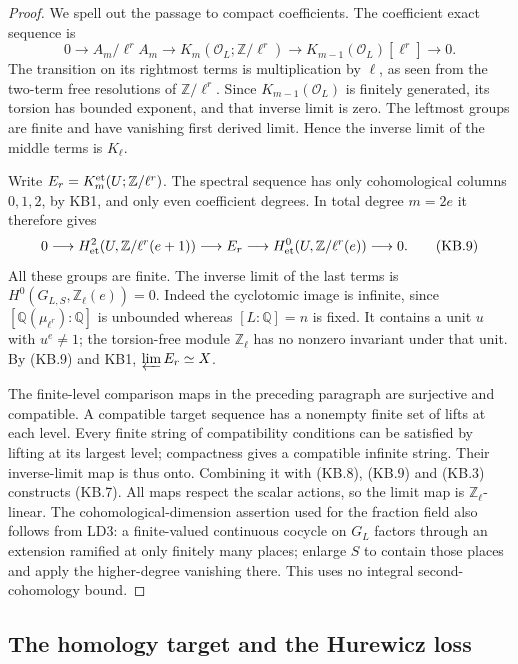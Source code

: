 \begin{proof}
We spell out the passage to compact coefficients.  The coefficient
exact sequence is
\[
 0\longrightarrow A_m/\ell^r A_m
 \longrightarrow K_m(\mathcal O_L;\mathbb Z/\ell^r)
 \longrightarrow K_{m-1}(\mathcal O_L)[\ell^r]
 \longrightarrow0.
 \tag{KB.8}
\]
The transition on its rightmost terms is multiplication by $\ell$,
as seen from the two-term free resolutions of $\mathbb Z/\ell^r$.
Since $K_{m-1}(\mathcal O_L)$ is finitely generated, its torsion has
bounded exponent, and that inverse limit is zero.  The leftmost
groups are finite and have vanishing first derived limit.  Hence
the inverse limit of the middle terms is $K_\ell$.

Write $E_r=K_m^{\rm et}(U;\mathbb Z/\ell^r)$.  The spectral sequence
has only cohomological columns $0,1,2$, by KB1, and only even
coefficient degrees.  In total degree $m=2e$ it therefore gives
\[
 0\longrightarrow H^2_{\rm et}(U,\mathbb Z/\ell^r(e+1))
 \longrightarrow E_r
 \longrightarrow H^0_{\rm et}(U,\mathbb Z/\ell^r(e))
 \longrightarrow0.
 \tag{KB.9}
\]
All these groups are finite.  The inverse limit of the last terms
is $H^0(G_{L,S},\mathbb Z_\ell(e))=0$.  Indeed the cyclotomic
image is infinite, since $[\mathbb Q(\mu_{\ell^r}):\mathbb Q]$
is unbounded whereas $[L:\mathbb Q]=n$ is fixed.  It contains a
unit $u$ with $u^e\ne1$; the torsion-free module
$\mathbb Z_\ell$ has no nonzero invariant under that unit.
By (KB.9) and KB1, $\varprojlim E_r\simeq X$.

The finite-level comparison maps in the preceding paragraph are
surjective and compatible.  A compatible target sequence has a
nonempty finite set of lifts at each level.  Every finite string
of compatibility conditions can be satisfied by lifting at its
largest level; compactness gives a compatible infinite string.
Their inverse-limit map is thus onto.  Combining it with (KB.8),
(KB.9) and (KB.3) constructs (KB.7).  All maps respect the scalar
actions, so the limit map is $\mathbb Z_\ell$-linear.
The cohomological-dimension assertion used for the fraction field
also follows from LD3: a finite-valued continuous cocycle on $G_L$
factors through an extension ramified at only finitely many places;
enlarge $S$ to contain those places and apply the higher-degree
vanishing there.  This uses no integral second-cohomology bound.
\end{proof}

\subsection{The homology target and the Hurewicz loss}

